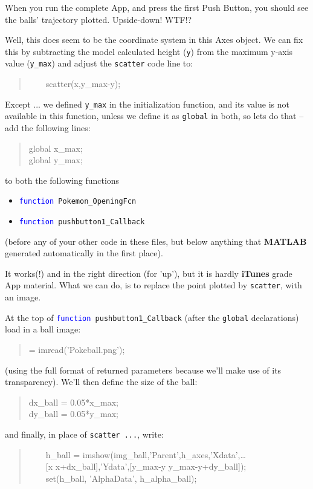 \documentclass{tufte-book} %
\newenvironment{docspec}{\begin{quotation}\ttfamily\parskip0pt\parindent0pt\ignorespaces}{\end{quotation}}
\begin{document}
When you run the complete App, and press the first \textsf{Push Button}, you should see the balls' trajectory plotted. Upside-down! WTF!?

Well, this does seem to be the coordinate system in this \textsf{Axes} object. We can fix this by subtracting the model calculated height (\texttt{y}) from the maximum y-axis value (\texttt{y\_max}) and adjust the \texttt{scatter} code line to:
\begin{docspec}
\ \ \ \    scatter(x,y\_max-y);
\end{docspec}
Except ... we defined \texttt{y\_max} in the initialization function, and its value is not available in this function, unless we define it as \texttt{global} in both, so lets do that -- add the following lines:
\begin{docspec}
global x\_max;
\\global y\_max;
\end{docspec}
to both the following functions
\begin{itemize}[noitemsep]
\setlength{\itemindent}{.2in}
\item \texttt{\textcolor{blue}{function} Pokemon\_OpeningFcn}
\item \texttt{\textcolor{blue}{function} pushbutton1\_Callback }
\end{itemize}
(before any of your other code in these files, but below anything that \textbf{MATLAB} generated automatically in the first place).

It works(!) and in the right direction (for 'up'), but it is hardly \textbf{iTunes} grade App material. What we can do, is to replace the point plotted by \texttt{scatter}, with an image.

At the top of \texttt{\textcolor{blue}{function} pushbutton1\_Callback} (after the \texttt{global} declarations) load in a ball image:
\begin{docspec}
[img\_ball, h\_map\_ball, h\_alpha\_ball] = imread('Pokeball.png');
\end{docspec}
(using the full format of returned parameters because we'll make use of its transparency). We'll then define the size of the ball:
\begin{docspec}
dx\_ball = 0.05*x\_max;
\\dy\_ball = 0.05*y\_max;
\end{docspec}
and finally, in place of \texttt{scatter ...}, write:
\begin{docspec}
\ \ \ \ h\_ball = imshow(img\_ball,'Parent',h\_axes,'Xdata',\ldots
\\ \ \ \ \ [x x+dx\_ball],'Ydata',[y\_max-y y\_max-y+dy\_ball]);
\\ \ \ \ \ set(h\_ball, 'AlphaData', h\_alpha\_ball);
\end{docspec}
\end{document}
